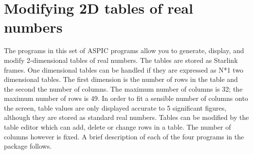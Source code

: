 \section {Modifying 2D tables of real numbers}

The programs in this set of ASPIC programs allow you to generate, display, and
modify 2-dimensional tables of real numbers.
The tables are stored as Starlink frames.
One dimensional tables can be handled if they are expressed as N*1 two
dimensional tables.
The first dimension is the number of rows in the table and the second the
number of columns.
The maximum number of columns is 32; the maximum number of rows is 49.
In order to fit a sensible number of columns onto the screen, table values are
only displayed accurate to 5 significant figures, although they are stored as
standard real numbers.
Tables can be modified by the table editor which can add, delete or change rows
in a table.
The number of columns however is fixed.
A brief description of each of the four programs in the package follows.
